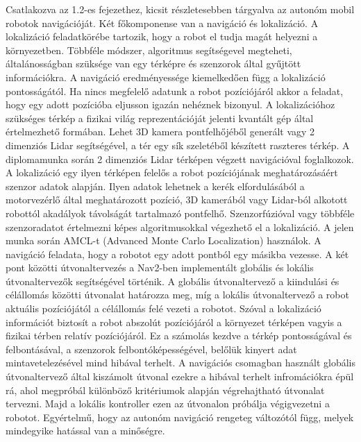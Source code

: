 Csatlakozva az 1.2-es fejezethez, kicsit részletesebben tárgyalva az autonóm mobil robotok navigációját. Két főkomponense van a navigáció és lokalizáció. A lokalizáció feladatkörébe tartozik, hogy a robot el tudja magát helyezni a környezetben. Többféle módszer, algoritmus segítségevel megteheti, általánosságban szüksége van egy térképre és szenzorok által gyűjtött információkra. A navigáció eredményessége kiemelkedően függ a lokalizáció pontosságától. Ha nincs megfelelő adatunk a robot pozíciójáról akkor a feladat, hogy egy adott pozícióba eljusson igazán nehéznek bizonyul. A lokalizációhoz szükséges térkép a fizikai világ reprezentációját jelenti kvantált gép által értelmezhető formában. Lehet 3D kamera pontfelhőjéből generált vagy 2 dimenziós Lidar segítségével, a tér egy sík szeletéből készített raszteres térkép. A diplomamunka során 2 dimenziós Lidar térképen végzett navigációval foglalkozok. A lokalizáció egy ilyen térképen felelős a robot pozíciójának meghatározásáért szenzor adatok alapján. Ilyen adatok lehetnek a kerék elfordulásából a motorvezérlő által meghatározott pozíció, 3D kamerából vagy Lidar-ból alkotott robottól akadályok távolságát tartalmazó pontfelhő. Szenzorfúzióval vagy többféle szenzoradatot értelmezni képes algoritmusokkal végezhető el a lokalizáció. A jelen munka során AMCL-t (Advanced Monte Carlo Localization) használok. A navigáció feladata, hogy a robotot egy adott pontból egy másikba vezesse. A két pont közötti útvonaltervezés a Nav2-ben implementált globális és lokális útvonaltervezők segítségével történik. A globális útvonaltervező a kiindulási és célállomás közötti útvonalat határozza meg, míg a lokális útvonaltervező a robot aktuális pozíciójától a célállomás felé vezeti a robotot. Szóval a lokalizáció információt biztosít a robot abszolút pozíciójáról a környezet térképen vagyis a fizikai térben relatív pozíciójáról. Ez a számolás kezdve a térkép pontosságával és felbontásával, a szenzorok felbontóképességével, belőlük kinyert adat mintavetelezésével mind hibával terhelt. A navigációs csomagban használt globális útvonaltervező által kiszámolt útvonal ezekre a hibával terhelt infromációkra épül rá, ahol megpróbál különböző kritériumok alapján végrehajtható útvonalat tervezni. Majd a lokális kontroller ezen az útvonalon próbálja végigvezetni a robotot. Egyértelmű, hogy az autonóm navigáció rengeteg változótól függ, melyek mindegyike hatással van a minőségre. \cite{ros2_article} \cite{nav2}

